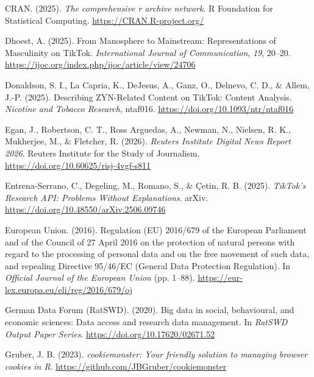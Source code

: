 \documentclass[
  nobib]{ccr}
\newlength{\cslhangindent}
\newenvironment{CSLReferences}[2] %
 {\begin{list}{}{%
  \setlength{\itemindent}{0pt}
  \setlength{\leftmargin}{0pt}
  \setlength{\parsep}{0pt}
  \ifodd #1
   \setlength{\leftmargin}{\cslhangindent}
   \setlength{\itemindent}{-1\cslhangindent}
  \fi
  \setlength{\itemsep}{#2\baselineskip}}}
 {\end{list}}
\begin{document}
\begin{CSLReferences}{1}{0}
CRAN. (2025). \emph{The comprehensive r archive network}. R Foundation
for Statistical Computing. \url{https://CRAN.R-project.org/}

Dhoest, A. (2025). From {Manosphere} to {Mainstream}: {Representations}
of {Masculinity} on {TikTok}. \emph{International Journal of
Communication}, \emph{19}, 20--20.
\url{https://ijoc.org/index.php/ijoc/article/view/24706}

Donaldson, S. I., La Capria, K., DeJesus, A., Ganz, O., Delnevo, C. D.,
\& Allem, J.-P. (2025). Describing {ZYN}-{Related} {Content} on
{TikTok}: {Content} {Analysis}. \emph{Nicotine and Tobacco Research},
ntaf016. \url{https://doi.org/10.1093/ntr/ntaf016}

Egan, J., Robertson, C. T., Ross Arguedas, A., Newman, N., Nielsen, R.
K., Mukherjee, M., \& Fletcher, R. (2026). \emph{Reuters {Institute}
{Digital} {News} {Report} 2026}. Reuters Institute for the Study of
Journalism. \url{https://doi.org/10.60625/risj-4vgf-s811}

Entrena-Serrano, C., Degeling, M., Romano, S., \& Çetin, R. B. (2025).
\emph{{TikTok}'s {Research} {API}: {Problems} {Without} {Explanations}}.
arXiv. \url{https://doi.org/10.48550/arXiv.2506.09746}

European Union. (2016). Regulation ({EU}) 2016/679 of the {European}
{Parliament} and of the {Council} of 27 {April} 2016 on the protection
of natural persons with regard to the processing of personal data and on
the free movement of such data, and repealing {Directive} 95/46/{EC}
({General} {Data} {Protection} {Regulation}). In \emph{Official Journal
of the European Union} (pp. 1--88).
\url{https://eur-lex.europa.eu/eli/reg/2016/679/oj}

German Data Forum (RatSWD). (2020). Big data in social, behavioural, and
economic sciences: {Data} access and research data management. In
\emph{RatSWD Output Paper Series}.
\url{https://doi.org/10.17620/02671.52}

Gruber, J. B. (2023). \emph{{cookiemonster}: Your friendly solution to
managing browser cookies in {R}}.
\url{https://github.com/JBGruber/cookiemonster}


\end{CSLReferences}
\end{document}
